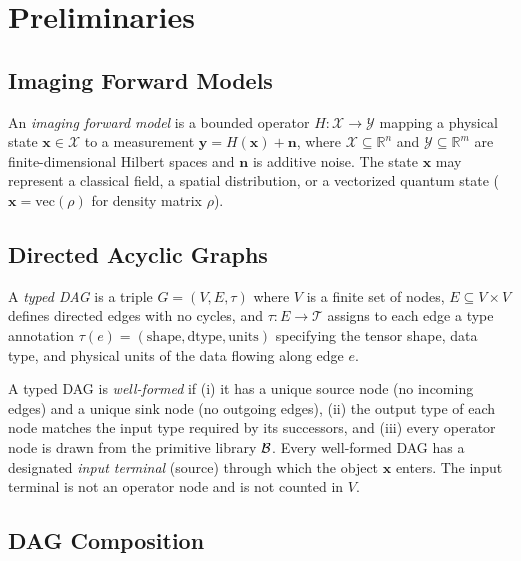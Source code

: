 \documentclass[11pt]{article}
\begin{document}
\section{Preliminaries}
\label{sec:prelim}

\subsection{Imaging Forward Models}

\begin{definition}
\label{def:fwd}
An \emph{imaging forward model} is a bounded operator $H: \mathcal{X} \to \mathcal{Y}$ mapping a physical state $\mathbf{x} \in \mathcal{X}$ to a measurement $\mathbf{y} = H(\mathbf{x}) + \mathbf{n}$, where $\mathcal{X} \subseteq \mathbb{R}^n$ and $\mathcal{Y} \subseteq \mathbb{R}^m$ are finite-dimensional Hilbert spaces and $\mathbf{n}$ is additive noise. The state $\mathbf{x}$ may represent a classical field, a spatial distribution, or a vectorized quantum state ($\mathbf{x} = \mathrm{vec}(\rho)$ for density matrix $\rho$).
\end{definition}

\subsection{Directed Acyclic Graphs}

\begin{definition}
\label{def:dag}
A \emph{typed DAG} is a triple $G = (V, E, \tau)$ where $V$ is a finite set of nodes, $E \subseteq V \times V$ defines directed edges with no cycles, and $\tau: E \to \mathcal{T}$ assigns to each edge a type annotation $\tau(e) = (\mathrm{shape}, \mathrm{dtype}, \mathrm{units})$ specifying the tensor shape, data type, and physical units of the data flowing along edge $e$.
\end{definition}

A typed DAG is \emph{well-formed} if (i) it has a unique source node (no incoming edges) and a unique sink node (no outgoing edges), (ii) the output type of each node matches the input type required by its successors, and (iii) every operator node is drawn from the primitive library $\mathcal{B}$. Every well-formed DAG has a designated \emph{input terminal} (source) through which the object $\mathbf{x}$ enters. The input terminal is not an operator node and is not counted in $V$.

\subsection{DAG Composition}
\end{document}
